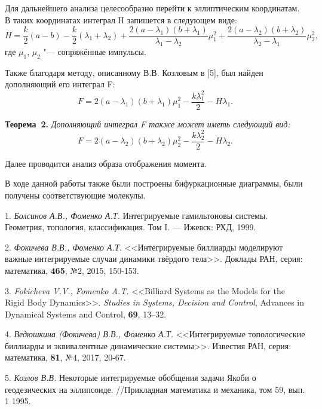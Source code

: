 Для дальнейшего анализа целесообразно перейти к эллиптическим координатам. В таких координатах интеграл H запишется в следующем виде:
$$H=\frac{k}{2}(a-b)-\frac{k}{2}(\lambda_1+\lambda_2)+\frac{2(a-\lambda_1)(b+\lambda_1)}{\lambda_1-\lambda_2}\mu_1^2+\frac{2(a-\lambda_2)(b+\lambda_2)}{\lambda_2-\lambda_1}\mu_2^2,$$
где $\mu_1$, $\mu_2$ "--- сопряжённые импульсы.

Также благодаря методу, описанному В.В. Козловым в [5], был найден дополняющий его интеграл F:
$$F=2(a-\lambda_1)(b+\lambda_1)\mu_1^2-\frac{k\lambda_1^2}{2}-H\lambda_1.$$

\textbf{Теорема~2.} {\it Дополняющий интеграл F также может иметь следующий вид:
$$F=2(a-\lambda_2)(b+\lambda_2)\mu_2^2-\frac{k\lambda_2^2}{2}-H\lambda_2.$$}

Далее проводится анализ образа отображения момента.

В ходе данной работы также были построены бифуркационные диаграммы, были получены соответствующие молекулы.

\litlist

1. {\it Болсинов А.В., Фоменко А.Т.} Интегрируемые гамильтоновы системы. Геометрия, топология, классификация. Том I. — Ижевск: РХД, 1999.

2. {\it Фокичева В.В., Фоменко А.Т.} <<Интегрируемые биллиарды моделируют важные интегрируемые случаи динамики твёрдого тела>>. Доклады РАН, серия: математика, {\bf 465}, №2, 2015, 150-153.

3. {\it Fokicheva V.V., Fomenko A.T.} <<Billiard Systems as the Models for the Rigid
Body Dynamics>>. {\it Studies in Systems, Decision and Control}, Advances in Dynamical
Systems and Control, {\bf 69}, 13–32.

4. {\it Ведюшкина (Фокичева) В.В., Фоменко А.Т.} <<Интегрируемые топологические биллиарды и эквивалентные динамические системы>>. Известия РАН, серия: математика, {\bf 81}, №4, 2017, 20-67.

5. {\it Козлов В.В.} Некоторые интегрируемые обобщения задачи Якоби о геодезических на эллипсоиде. //Прикладная математика и механика, том 59, вып. 1 1995.
